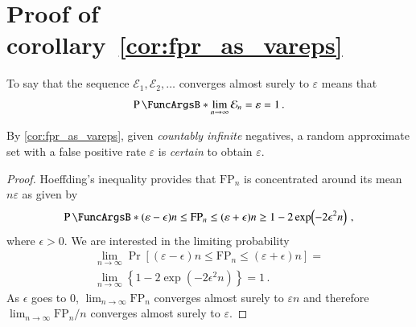 \documentclass[10pt,final,hidelinks]{article}
\numberwithin{equation}{section}
\newcommand{\FPR}{\mathcal{E}}
\newcommand{\FP}{\RV{FP}}
\newcommand{\fprate}{\varepsilon}
\newcommand{\RV}[1]{\mathrm{#1}}
\theoremstyle{plain}
\begin{document}
	
\appendices
{

\section{Proof of corollary~\ref{cor:fpr_as_vareps}}
\label{app:cor_fpr_as_vareps}
To say that the sequence $\FPR_1,\FPR_2,\ldots$ converges almost surely to $\fprate$ means that
\begin{equation}
\Prob{\lim _{n \to \infty} \FPR_n = \fprate} = 1\,.
\end{equation}

By \cref{cor:fpr_as_vareps}, given \emph{countably infinite} negatives, a random approximate set with a false positive rate $\fprate$ is \emph{certain} to obtain $\fprate$.
\begin{proof}
Hoeffding's inequality\cite{hoeffding} provides that $\FP_n$ is concentrated around its mean $n \fprate$ as given by
\begin{equation}
\Prob{(\fprate -\epsilon) n \leq \FP_n \leq (\fprate + \epsilon )n}
\geq 1 - 2 \exp\!\left(-2\epsilon ^{2} n\right)\,,
\end{equation}
where $\epsilon > 0$.
We are interested in the limiting probability
\begin{equation}
\begin{split}
\lim_{n \to \infty} \Pr\!\left[(\fprate -\epsilon) n \leq 
\FP_n \leq (\fprate + \epsilon)n\right] =\\
\lim_{n \to \infty} \left\{ 1 - 
2 \exp\!\left(-2\epsilon ^{2} n\right) \right\} = 1\,.
\end{split}
\end{equation}
As $\epsilon$ goes to $0$, $\lim_{n \to \infty} \FP_n$ converges almost surely to $\fprate n$ and therefore $\lim_{n \to \infty} \FP_n / n$ converges almost surely to $\fprate$.
\end{proof}

}
\end{document}
